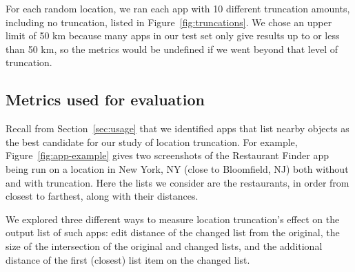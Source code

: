 \documentclass[10pt, conference, compsocconf]{IEEEtran}
\begin{document}
{For each random location, we ran each app with 10 different truncation
amounts, including no truncation, listed in
Figure~\ref{fig:truncations}.  We chose an upper limit of 50 km because 
many apps in our 
test set only give results up to or less than 50 km, so the metrics would
be undefined if we went beyond that level of truncation.

\subsection{Metrics used for evaluation}
\label{sec:metrics}

Recall from Section~\ref{sec:usage} that we identified apps that list
nearby objects as the best candidate for our study of location
truncation. For example, Figure~\ref{fig:app-example} gives two
screenshots of the Restaurant Finder app being run on a location in
New York, NY (close to Bloomfield, NJ) both without and with
truncation. Here the lists we consider are the restaurants, in order
from closest to farthest, along with their distances.

We explored three different ways to measure location truncation's effect on
the output list of such apps: edit distance of the changed list from the
original, the size of the intersection of the original and changed
lists, and the additional distance of the first (closest) list item on
the changed list.

}
\end{document}
